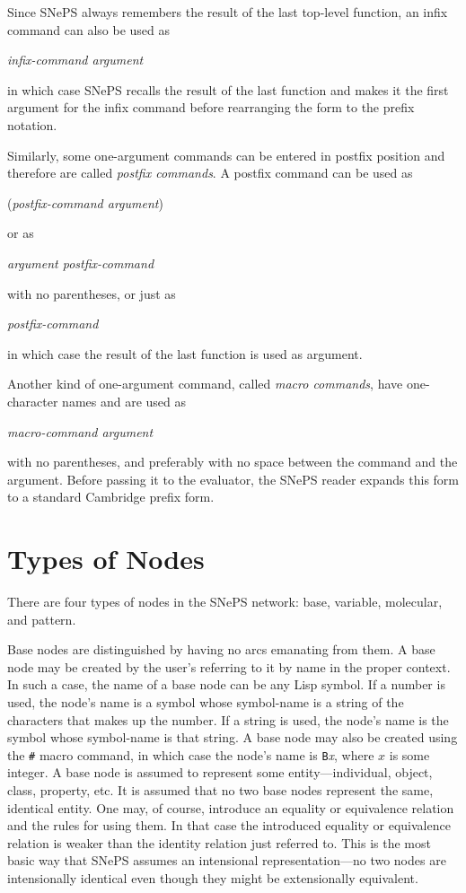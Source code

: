 \documentclass{book}
\makeatletter
\newcommand{\ct}[1]{{\ttfamily #1}} %
\newcommand{\indexct}[1]{\index{#1@\ct{#1}}} %
\makeatother
\begin{document}
Since SNePS always remembers the result of the last top-level function, an
infix command can also be used as
\begin{center}
{\em infix-command argument}
\end{center}
in which case SNePS recalls the result of the last function and makes it the
first argument for the infix command before rearranging the form to the prefix
notation.

Similarly, some one-argument commands can be entered in postfix position and
therefore are called {\em postfix commands}.
A postfix command can be used as
\begin{center}
({\em postfix-command argument}) 
\end{center}
or as
\begin{center} \em
argument postfix-command
\end{center}
with no parentheses, or just as
\begin{center} \em
postfix-command
\end{center}
in which case the result of the last function is used as argument.

Another kind of one-argument command, called {\em macro
commands}, have one-character names and are used
as
\begin{center}
{\em macro-command argument}
\end{center}
with no parentheses, and preferably with no space between the command
and the argument. Before passing it to the evaluator, the SNePS reader 
expands this form to a standard Cambridge prefix form.

\section{Types of Nodes}\label{sec:nodeTypes}
There are four types of nodes in the SNePS
network: base, variable, molecular, and pattern.

Base nodes are distinguished by having no arcs
emanating from them.  A base node may be created by the user's
referring to it by name in the proper context.  In such a case, the
name of a base node can be any Lisp symbol.  If a number is used, the
node's name is a symbol whose symbol-name is a string of the
characters that makes up the number.  If a string is used, the node's
name is the symbol whose symbol-name is that string.  A base node may
also be created using the {\tt \#}\indexct{\#} macro command, in which
case the node's name is {\tt B}{\em x}, where $x$ is some integer.  A
base node is assumed to represent some entity---individual, object,
class, property, etc.  It is assumed that no two base nodes represent
the same, identical entity.  One may, of course, introduce an equality
or equivalence relation and the rules for using them.  In that case
the introduced equality or equivalence relation is weaker than the
identity relation just referred to.  This is the most basic way that
SNePS assumes an intensional representation---no two nodes are
intensionally identical even though they might be extensionally
equivalent.
\end{document}
